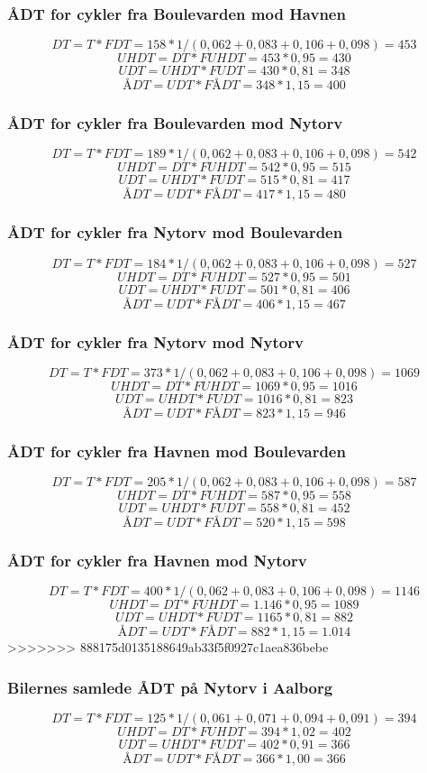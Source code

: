\subsubsection{ÅDT for cykler fra Boulevarden mod Havnen}
$$DT = T * FDT = 158 * 1/(0,062 +0,083+0,106+0,098) = 453$$
$$UHDT = DT * FUHDT = 453 * 0,95 = 430$$
$$UDT = UHDT * FUDT = 430 * 0,81 = 348$$
$$ÅDT = UDT * FÅDT = 348 * 1,15 = 400$$
\subsubsection{ÅDT for cykler fra Boulevarden mod Nytorv}
$$DT = T * FDT = 189 * 1/(0,062 +0,083+0,106+0,098) = 542$$
$$UHDT = DT * FUHDT = 542 * 0,95 = 515$$
$$UDT = UHDT * FUDT = 515 * 0,81 = 417$$
$$ÅDT = UDT * FÅDT = 417 * 1,15 = 480$$
\subsubsection{ÅDT for cykler fra Nytorv mod Boulevarden}
$$DT = T * FDT = 184* 1/(0,062 +0,083+0,106+0,098) = 527$$
$$UHDT = DT * FUHDT = 527 * 0,95 = 501$$
$$UDT = UHDT * FUDT = 501 * 0,81 = 406$$
$$ÅDT = UDT * FÅDT = 406 * 1,15 = 467$$
\subsubsection{ÅDT for cykler fra Nytorv mod Nytorv}
$$DT = T * FDT = 373 * 1/(0,062 +0,083+0,106+0,098) = 1069$$
$$UHDT = DT * FUHDT = 1069 * 0,95 = 1016$$
$$UDT = UHDT * FUDT = 1016 * 0,81 = 823$$
$$ÅDT = UDT * FÅDT = 823 * 1,15 = 946$$
\subsubsection{ÅDT for cykler fra Havnen mod Boulevarden}
$$DT = T * FDT = 205* 1/(0,062 +0,083+0,106+0,098) = 587$$
$$UHDT = DT * FUHDT = 587 * 0,95 = 558$$
$$UDT = UHDT * FUDT = 558 * 0,81 = 452$$
$$ÅDT = UDT * FÅDT = 520 * 1,15 = 598$$
\subsubsection{ÅDT for cykler fra Havnen mod Nytorv}
$$DT = T * FDT = 400* 1/(0,062 +0,083+0,106+0,098)  = 1146$$
$$UHDT = DT * FUHDT = 1.146 * 0,95 = 1089$$
$$UDT = UHDT * FUDT = 1165 * 0,81 = 882$$
$$ÅDT = UDT * FÅDT = 882 * 1,15 = 1.014$$
>>>>>>> 888175d0135188649ab33f5f0927c1aea836bebe
\subsubsection{Bilernes samlede ÅDT på Nytorv i Aalborg}
$$DT = T * FDT = 125 * 1/(0,061+0,071+0,094+0,091) = 394$$
$$UHDT = DT * FUHDT = 394 * 1,02 = 402$$
$$UDT = UHDT * FUDT = 402 * 0,91 = 366$$
$$ÅDT = UDT * FÅDT = 366 * 1,00 = 366$$
